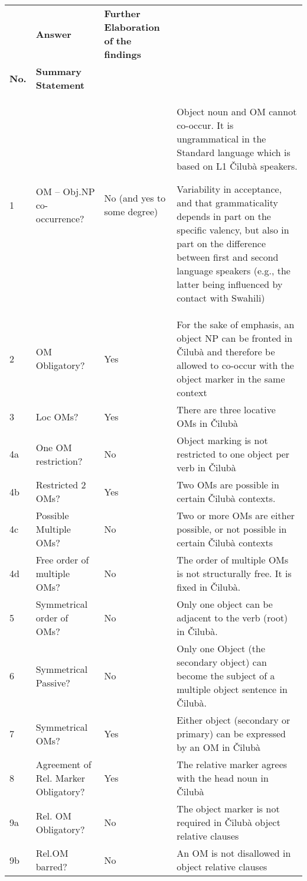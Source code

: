\documentclass[output=paper]{langscibook}
\begin{document}
\begin{tabularx}{\textwidth}{XXXX}

\lsptoprule

\multicolumn{2}{c}{ \textbf{Parameter}} & \textbf{Answer} & \textbf{Further} \textbf{Elaboration} \textbf{of} \textbf{the} \textbf{findings}\\
\textbf{No.} & \textbf{Summary} \textbf{Statement} &  & \\
1 & OM – Obj.NP co-occurrence? & No (and yes to some degree) & Object noun and OM cannot co-occur. It is ungrammatical in the Standard language which is based on L1 Čilubà speakers. 

Variability in acceptance, and that grammaticality depends in part on the specific valency, but also in part on the difference between first and second language speakers (e.g., the latter being influenced by contact with Swahili) \\
2 & OM Obligatory? & Yes & For the sake of emphasis, an object NP can be fronted in Čilubà and therefore be allowed to co-occur with the object marker in the same context\\
3 & Loc OMs? & Yes & There are three locative OMs in Čilubà\\
4a & One OM restriction? & No & Object marking is not restricted to one object per verb in Čilubà\\
4b & Restricted 2 OMs? & Yes & Two OMs are possible in certain Čilubà contexts.\\
4c & Possible Multiple OMs? & No & Two or more OMs are either possible, or not possible in certain Čilubà contexts\\
4d & Free order of multiple OMs? & No & The order of multiple OMs is not structurally free. It is fixed in Čilubà.\\
5 & Symmetrical order of OMs? & No & Only one object can be adjacent to the verb (root) in Čilubà.\\
6 & Symmetrical Passive? & No & Only one Object (the secondary object) can become the subject of a multiple object sentence in Čilubà.\\
7 & Symmetrical OMs? & Yes & Either object (secondary or primary) can be expressed by an OM in Čilubà\\
8 & Agreement of Rel. Marker Obligatory? & Yes & The relative marker agrees with the head noun in Čilubà\\
9a & Rel. OM Obligatory? & No & The object marker is not required in Čilubà object relative clauses\\
9b & Rel.OM barred? & No & An OM is not disallowed in object relative clauses\\

\end{tabularx}
\end{document}
